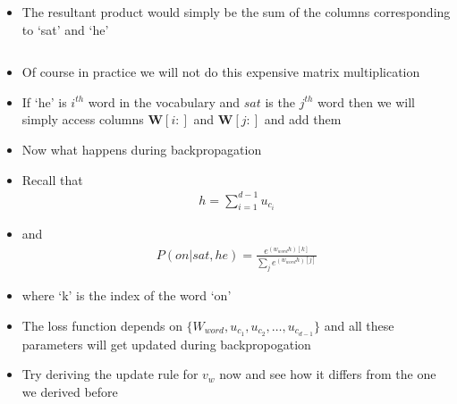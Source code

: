 \begin{frame}
\begin{columns}
\begin{overlayarea}{\textwidth}{\textheight}
{\begin{itemize}
{\begin{align*}
\begin{array}[c]{@{}l@{}l}
						   \vphantom{0}\\
						   \left. \vphantom{0} \hspace{-0.5cm}\right\} \text{$he$} \\
						   \end{array}\\
						\onslide<6->{&= \begin{bmatrix}
							2.5\\
							-3\\
							4.7
						\end{bmatrix}}
					 \end{align*}%
					 \vspace{-5mm}
				 }
				 \item<7-> The resultant product would simply be the sum of the columns corresponding to `sat' and `he'
			\end{itemize}}
		\end{overlayarea}
	\end{columns}
\end{frame}

\begin{frame}
	\begin{itemize}
		\item<1-> Of course in practice we will not do this expensive matrix multiplication
		\item<2-> If `he' is $i^{th}$ word in the vocabulary and $sat$ is the $j^{th}$ word then we will simply access columns $\mathbf{W}[i:]$ and $\mathbf{W}[j:]$ and add them
	\end{itemize}
\end{frame}

\begin{frame}
	\begin{itemize}
		\item<1-> Now what happens during backpropagation
		\item<2-> Recall that
			\begin{align*}
				h = \sum_{i=1}^{d-1} u_{c_i}
			\end{align*}
		\item<3-> and 
			\begin{align*}
				P(on|sat,he) = \frac{e^{(w_{word}h)[k]}}{\sum_j e^{(w_{word}h)[j]}}
			\end{align*}
		\item<4-> where `k' is the index of the word `on'
		\item<5-> The loss function depends on $\{W_{word}, u_{c_1},u_{c_2},\ldots,u_{c_{d-1}}\}$ and all these parameters will get updated during backpropogation
		\item<6-> Try deriving the update rule for $v_w$ now and see how it differs from the one we derived before
	\end{itemize}
\end{frame}


